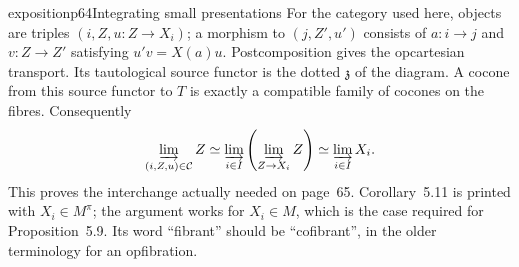\begin{dcomment}{exposition}{p64}{Integrating small presentations}
For the category used here, objects are triples $(i,Z,u:Z\to X_i)$; a morphism to $(j,Z',u')$ consists of $a:i\to j$ and $v:Z\to Z'$ satisfying $u'v=X(a)u$. Postcomposition gives the opcartesian transport. Its tautological source functor is the dotted $\mathfrak z$ of the diagram. A cocone from this source functor to $T$ is exactly a compatible family of cocones on the fibres. Consequently
\[
 \varinjlim_{(i,Z,u)\in\mathcal C}Z
 \simeq\varinjlim_{i\in I}\left(\varinjlim_{Z\to X_i}Z\right)
 \simeq\varinjlim_{i\in I}X_i.
\]
This proves the interchange actually needed on page~65. Corollary~5.11 is printed with $X_i\in M^\pi$; the argument works for $X_i\in M$, which is the case required for Proposition~5.9. Its word ``fibrant'' should be ``cofibrant'', in the older terminology for an opfibration.
\end{dcomment}

